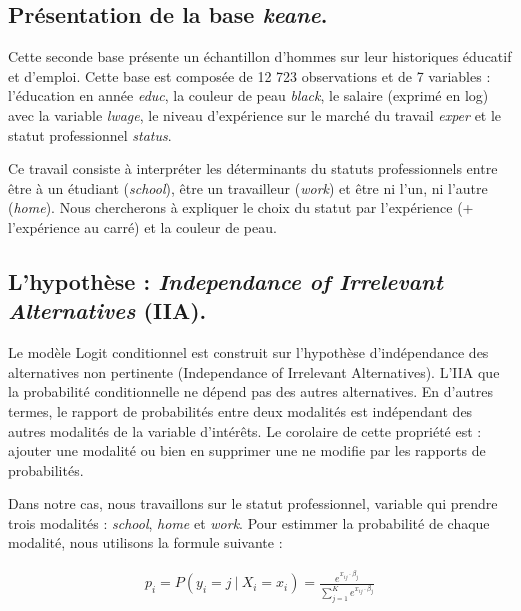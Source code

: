 \subsection*{Présentation de la base \emph{keane}.}

Cette seconde base présente un échantillon d'hommes sur leur historiques éducatif et d'emploi. Cette base est composée de 12 723 observations et de 7 variables :  l'éducation en année \emph{educ}, la couleur de peau \emph{black}, le salaire (exprimé en log) avec la variable \emph{lwage}, le niveau d'expérience sur le marché du travail \emph{exper} et le statut professionnel \emph{status}.

\vspace*{0.3cm}

Ce travail consiste à interpréter les déterminants du statuts professionnels entre être à un étudiant (\emph{school}), être un travailleur (\emph{work}) et être ni l'un, ni l'autre (\emph{home}). Nous chercherons à expliquer le choix du statut par l'expérience (+ l'expérience au carré) et la couleur de peau.




\subsection{L'hypothèse : \emph{Independance of Irrelevant Alternatives} (IIA).}

Le modèle Logit conditionnel est construit sur l’hypothèse d’indépendance des alternatives non pertinente (Independance of Irrelevant Alternatives). L'IIA que la probabilité conditionnelle ne dépend pas des autres alternatives. En d'autres termes, le rapport de probabilités entre deux modalités est indépendant des autres modalités de la variable d’intérêts. Le corolaire de cette propriété est : ajouter une modalité ou bien en supprimer une ne modifie par les rapports de probabilités. 

\vspace*{0.3cm}

Dans notre cas, nous travaillons sur le statut professionnel, variable qui prendre trois modalités : \emph{school}, \emph{home} et \emph{work}. Pour estimmer la probabilité de chaque modalité, nous utilisons la formule suivante : 

\begin{align*}
    p_i = P(y_i = j \: | \: X_i = x_i) = \frac{e^{x_{ij} \cdot \beta_j}}{\sum_{j=1}^{K} e^{x_{ij} \cdot \beta_j}} 
\end{align*}

